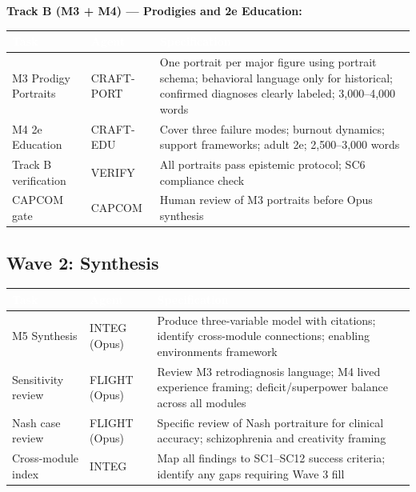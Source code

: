 \documentclass[11pt,letterpaper]{article}
\newcommand{\tableheader}[1]{\textbf{\sffamily\textcolor{white}{#1}}}
\begin{document}
\textbf{Track B (M3 + M4) --- Prodigies and 2e Education:}

\begin{center}
\begin{tabularx}{\textwidth}{L{3cm}L{2cm}X}
\toprule
{}
\tableheader{Task} & \tableheader{Agent} & \tableheader{Specification} \\
\midrule
M3 Prodigy Portraits & CRAFT-PORT & One portrait per major figure using portrait schema; behavioral language only for historical; confirmed diagnoses clearly labeled; 3,000--4,000 words \\
M4 2e Education & CRAFT-EDU & Cover three failure modes; burnout dynamics; support frameworks; adult 2e; 2,500--3,000 words \\
Track B verification & VERIFY & All portraits pass epistemic protocol; SC6 compliance check \\
CAPCOM gate & CAPCOM & Human review of M3 portraits before Opus synthesis \\
\bottomrule
\end{tabularx}
\end{center}

\subsection{Wave 2: Synthesis}

\begin{center}
\begin{tabularx}{\textwidth}{L{3cm}L{2cm}X}
\toprule
{}
\tableheader{Task} & \tableheader{Agent} & \tableheader{Specification} \\
\midrule
M5 Synthesis & INTEG (Opus) & Produce three-variable model with citations; identify cross-module connections; enabling environments framework \\
Sensitivity review & FLIGHT (Opus) & Review M3 retrodiagnosis language; M4 lived experience framing; deficit/superpower balance across all modules \\
Nash case review & FLIGHT (Opus) & Specific review of Nash portraiture for clinical accuracy; schizophrenia and creativity framing \\
Cross-module index & INTEG & Map all findings to SC1--SC12 success criteria; identify any gaps requiring Wave 3 fill \\
\bottomrule
\end{tabularx}
\end{center}
\end{document}
